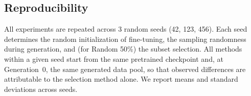 \subsection{Reproducibility}

All experiments are repeated across 3 random seeds (42, 123, 456). Each seed determines the random initialization of fine-tuning, the sampling randomness during generation, and (for Random 50\%) the subset selection. All methods within a given seed start from the same pretrained checkpoint and, at Generation~0, the same generated data pool, so that observed differences are attributable to the selection method alone. We report means and standard deviations across seeds.